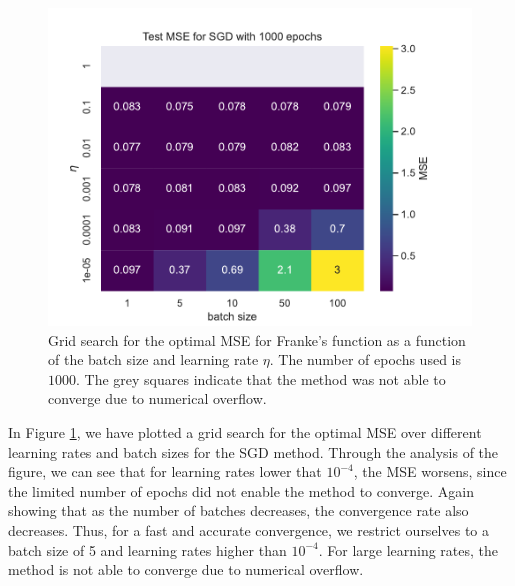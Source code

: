 \documentclass[aps,reprint,superscriptaddress,nofootinbib]{revtex4-2}
\begin{document}
\begin{figure}[htp]
    \centering
    \includegraphics[width=\linewidth]{part_a/3_mse_eta_size_batch_epochs_1000.pdf}
    \caption{Grid search for the optimal MSE for Franke's function as a function of the batch size and learning rate \(\eta\). The number of epochs used is \(1000\). The grey squares indicate that the method was not able to converge due to numerical overflow.}
    \label{fig:grid_mse_batch_eta}
\end{figure}

In Figure \ref{fig:grid_mse_batch_eta}, we have plotted a grid search for the optimal MSE over different learning rates and batch sizes for the SGD method. Through the analysis of the figure, we can see that for learning rates lower that \(10^{-4}\), the MSE worsens, since the limited number of epochs did not enable the method to converge. Again showing that as the number of batches decreases, the convergence rate also decreases. Thus, for a fast and accurate convergence, we restrict ourselves to a batch size of 5 and learning rates higher than \(10^{-4}\). For large learning rates, the method is not able to converge due to numerical overflow.

\end{document}
